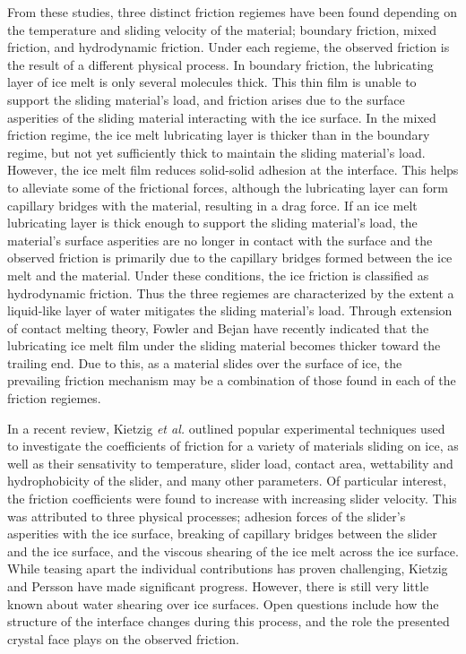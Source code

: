 From these studies, three distinct friction regiemes
have been found depending on the temperature and sliding velocity of the 
material; boundary friction, mixed friction, and hydrodynamic 
friction.\cite{Bhushan2002,Persson2015,Tuononen2016,Kietzig2009,Kietzig2010} 
Under each regieme, the observed 
friction is the result of a different physical process. In boundary friction, 
the lubricating layer of ice melt is only several molecules thick. 
This thin film is unable to support the sliding material's load, and friction
arises due to the surface asperities of the sliding material 
interacting with the ice surface.\cite{Bhushan2002} In the mixed friction 
regime, the ice melt lubricating layer is thicker than in the boundary regime,
but not yet sufficiently thick to maintain the 
sliding material's load. However, the ice melt film reduces solid-solid 
adhesion at the interface. This helps to alleviate some of the frictional 
forces, although the lubricating layer can form capillary bridges with the 
material, resulting in a drag force.\cite{Kietzig2009,Kietzig2010} If an 
ice melt lubricating layer is thick enough
to support the sliding material's load, the material's surface asperities are 
no longer in contact with the surface and the observed friction is primarily 
due to the capillary bridges formed between the ice melt and the material.
Under these conditions, the ice friction is classified as hydrodynamic 
friction.\cite{Kietzig2009,Kietzig2010} Thus the three regiemes are characterized by the 
extent a liquid-like layer of water mitigates the sliding material's load.
Through extension of contact melting theory, Fowler and Bejan have recently 
indicated that the lubricating ice melt film under the sliding material becomes 
thicker toward the trailing end.\cite{Fowler1993} Due to this, as a material 
slides over the surface of ice, the prevailing friction mechanism may be a 
combination of those found in each of the friction regiemes. 

In a recent review\cite{Kietzig2010}, Kietzig \textit{et al.} outlined 
popular experimental techniques used to investigate the coefficients of 
friction for a variety of materials sliding on ice, as well as their 
sensativity to temperature, slider load,
contact area, wettability and hydrophobicity of the slider, and many other
parameters. Of particular interest, the friction coefficients were found to 
increase with increasing slider velocity. This was attributed to three 
physical processes; adhesion forces of the
slider's asperities with the ice surface, breaking of capillary bridges 
between the slider and the ice surface, and the viscous shearing of the 
ice melt across the ice surface. While teasing apart the individual 
contributions has proven challenging, Kietzig\cite{Kietzig2009} and
Persson\cite{Persson2015,Tuononen2016} 
have made significant progress. However, there is still very little known about
water shearing over ice surfaces. Open questions include how the
structure of the interface changes 
during this process, and the role the presented crystal face plays on
the observed friction. 

